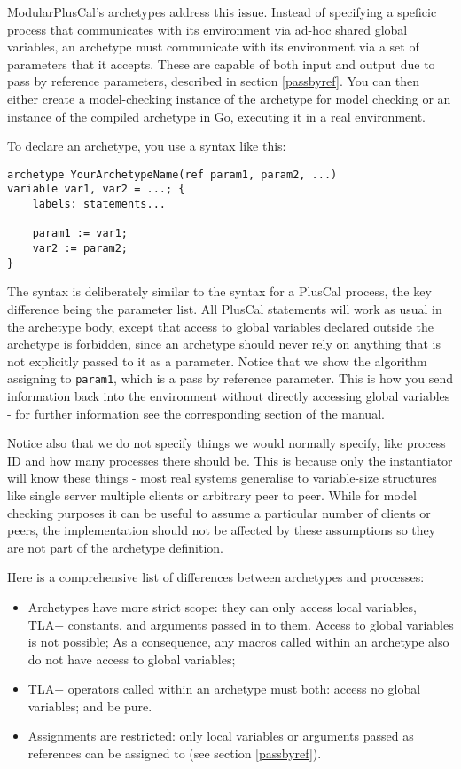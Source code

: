 ModularPlusCal's archetypes address this issue. Instead of specifying a speficic process that communicates with its environment via ad-hoc shared global variables, an archetype must communicate with its environment via a set of parameters that it accepts. These are capable of both input and output due to pass by reference parameters, described in section \ref{passbyref}. You can then either create a model-checking instance of the archetype for model checking or an instance of the compiled archetype in Go, executing it in a real environment.

To declare an archetype, you use a syntax like this:
\begin{lstlisting}[language=pcal]
archetype YourArchetypeName(ref param1, param2, ...)
variable var1, var2 = ...; {
    labels: statements...
    
    param1 := var1;
    var2 := param2;
}
\end{lstlisting}

The syntax is deliberately similar to the syntax for a PlusCal process, the key difference
being the parameter list. All PlusCal statements will work as usual in the archetype body, except that access to global variables declared outside the archetype is forbidden, since an archetype should never rely on anything that is not explicitly passed to it as a parameter. Notice that we show the algorithm assigning to \lstinline|param1|, which is a pass by reference parameter. This is how you send information back into the environment without directly accessing global variables - for further information see the corresponding section of the manual.

Notice also that we do not specify things we would normally specify, like process ID and how many processes there should be. This is because only the instantiator will know these things - most real systems generalise to variable-size structures like single server multiple clients or arbitrary peer to peer. While for model checking purposes it can be useful to assume a particular number of clients or peers, the implementation should not be affected by these assumptions so they are not part of the archetype definition.

Here is a comprehensive list of differences between archetypes and processes:
\begin{itemize}
    \item Archetypes have more strict scope: they can only access local variables, TLA+ constants, and arguments passed in to them. Access to global variables is not possible;
    As a consequence, any macros called within an archetype also do not have access to global variables;
    \item TLA+ operators called within an archetype must both: access no global variables; and be pure.
    \item Assignments are restricted: only local variables or arguments passed as references can be assigned to (see section \ref{passbyref}).
\end{itemize}

